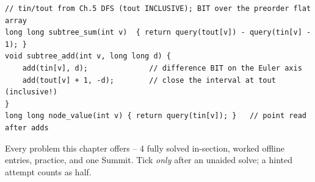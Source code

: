 \begin{lstlisting}[caption={Drill 5 -- Euler subtree add / sum (from lst:c14-subtree)}]
// tin/tout from Ch.5 DFS (tout INCLUSIVE); BIT over the preorder flat array
long long subtree_sum(int v)  { return query(tout[v]) - query(tin[v] - 1); }
void subtree_add(int v, long long d) {
    add(tin[v], d);              // difference BIT on the Euler axis
    add(tout[v] + 1, -d);        // close the interval at tout (inclusive!)
}
long long node_value(int v) { return query(tin[v]); }   // point read after adds
\end{lstlisting}


Every problem this chapter offers -- 4 fully solved in-section, worked offline
entries, practice, and one Summit. Tick \emph{only} after an unaided solve; a
hinted attempt counts as half.

